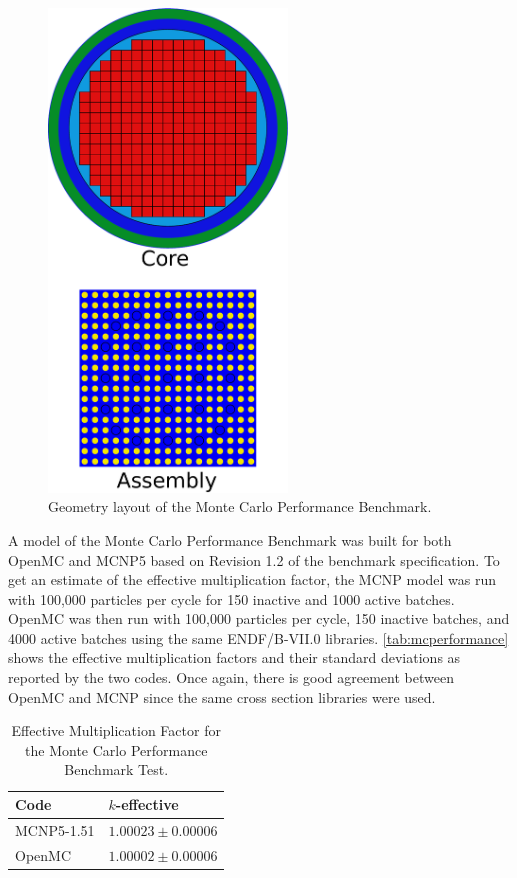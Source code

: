 \documentclass[authoryear,preprint]{elsarticle}
\begin{document}
\begin{figure}[!ht]
  \centering
  \includegraphics[width=2.5in]{mcperformance.pdf}
  \caption{Geometry layout of the Monte Carlo Performance Benchmark.}
  \label{fig:core}
\end{figure}

A model of the Monte Carlo Performance Benchmark was built for both OpenMC and
MCNP5 based on Revision 1.2 of the benchmark specification. To get an estimate
of the effective multiplication factor, the MCNP model was run with 100,000
particles per cycle for 150 inactive and 1000 active batches. OpenMC was then
run with 100,000 particles per cycle, 150 inactive batches, and 4000 active
batches using the same ENDF/B-VII.0 libraries. \autoref{tab:mcperformance} shows
the effective multiplication factors and their standard deviations as reported
by the two codes. Once again, there is good agreement between OpenMC and MCNP
since the same cross section libraries were used.

\begin{table}
  \caption{Effective Multiplication Factor for the Monte Carlo Performance
    Benchmark Test.}
  \label{tab:mcperformance}
  \begin{center}
  \begin{tabular}{ l l }
    \toprule
    Code & $k$-effective \\
    \midrule
    MCNP5-1.51 & $1.00023 \pm 0.00006$ \\
    OpenMC     & $1.00002 \pm 0.00006$ \\
    \bottomrule
  \end{tabular}
  \end{center}
\end{table}
\end{document}
